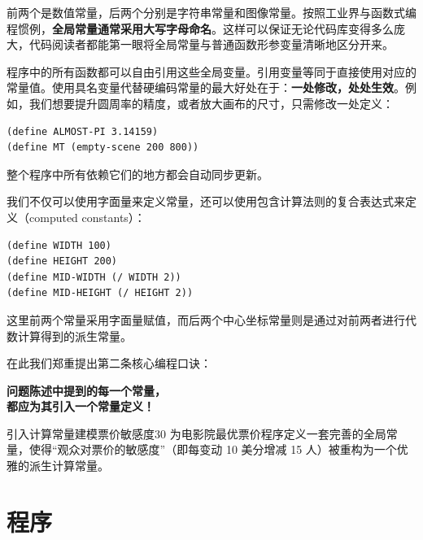 前两个是数值常量，后两个分别是字符串常量和图像常量。按照工业界与函数式编程惯例，\textbf{全局常量通常采用大写字母命名}。这样可以保证无论代码库变得多么庞大，代码阅读者都能第一眼将全局常量与普通函数形参变量清晰地区分开来。

程序中的所有函数都可以自由引用这些全局变量。引用变量等同于直接使用对应的常量值。使用具名变量代替硬编码常量的最大好处在于：\textbf{一处修改，处处生效}。例如，我们想要提升圆周率的精度，或者放大画布的尺寸，只需修改一处定义：
\begin{lstlisting}[language=BSL]
(define ALMOST-PI 3.14159)
(define MT (empty-scene 200 800))
\end{lstlisting}
整个程序中所有依赖它们的地方都会自动同步更新。

我们不仅可以使用字面量来定义常量，还可以使用包含计算法则的复合表达式来定义（computed constants）：
\begin{lstlisting}[language=BSL]
(define WIDTH 100)
(define HEIGHT 200)
(define MID-WIDTH (/ WIDTH 2))
(define MID-HEIGHT (/ HEIGHT 2))
\end{lstlisting}
这里前两个常量采用字面量赋值，而后两个中心坐标常量则是通过对前两者进行代数计算得到的派生常量。

在此我们郑重提出第二条核心编程口诀：

\begin{notebox}[核心设计口诀]
\centering\Large\bfseries
问题陈述中提到的每一个常量，\\
都应为其引入一个常量定义！
\end{notebox}

\begin{exercise}{引入计算常量建模票价敏感度}{30}
为电影院最优票价程序定义一套完善的全局常量，使得“观众对票价的敏感度”（即每变动 10 美分增减 15 人）被重构为一个优雅的派生计算常量。
\end{exercise}


\section{程序}
\label{sec:2.5}

